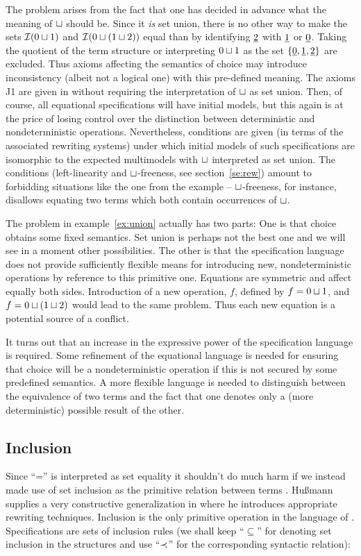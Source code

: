 {The problem arises from the fact that one has decided in advance what
the meaning of $\sqcup$ should be. Since it {\em is} set union, there is
no other way to make the sets ${\cal I}(0\sqcup 1)$ and ${\cal I}(0\sqcup (1\sqcup 2))$
equal than by identifying $\underline{2}$ with $\underline{1}$ or $\underline{0}$. Taking
the quotient of the term structure or interpreting $0\sqcup 1$ as the set
$\{\underline{0},\underline{1},\underline{2}\}$ are excluded.  Thus axioms affecting the
semantics of choice may introduce inconsistency (albeit not a logical
one) with this pre-defined meaning.  The axioms J1 are given in
\cite{c:63} without requiring the interpretation of $\sqcup$ as set
union. Then, of course, all equational specifications will have
initial models, but this again is at the price of losing control over
the distinction between deterministic and nondeterministic operations.
Nevertheless, conditions are given (in terms of the associated
rewriting systems) under which initial models of such specifications
are isomorphic to the expected multimodels with $\sqcup$ interpreted as
set union. The conditions (left-linearity and $\sqcup$-freeness, see
section~\ref{se:rew}) amount to forbidding situations like the one
from the example -- $\sqcup$-freeness, for instance, disallows equating
two terms which both contain occurrences of $\sqcup$.

The problem in example~\ref{ex:union} actually has two parts: One is that choice obtains some fixed 
semantics. Set union is perhaps not the best one and we will see in a moment other  possibilities. The 
other is that the specification language does not provide sufficiently flexible means for introducing new, 
nondeterministic operations by reference to this primitive one. Equations are symmetric and affect equally 
both sides. Introduction of a new operation, $f$, defined by $f=0\sqcup 1$, 
and $f=0\sqcup (1\sqcup 2)$ would lead to the same 
problem. Thus each new equation is a potential source of a conflict. 

It turns out that an increase in the expressive power of the specification language is required. Some 
refinement of the equational language is needed for ensuring that choice will be a nondeterministic 
operation if this is not secured by some predefined semantics. A more flexible language is needed to 
distinguish between the equivalence of two terms and the fact that one denotes only a (more 
deterministic) possible result of the other.

\subsection{Inclusion}\label{sub:inclusion}
Since ``='' is interpreted as set equality it shouldn't do much harm
if we instead made use of set inclusion as the primitive relation
between terms \cite{c:59, c:58, c:127, c:133, c:130}.  Hu{\ss}mann
supplies a very constructive generalization in \cite{c:59, c:58} where
he introduces appropriate rewriting techniques. Inclusion is the only
primitive operation in the language of \cite{c:59,
c:58}. Specifications are sets of inclusion rules (we shall keep
``$\subseteq$'' for denoting set inclusion in the structures and use
``$\mathrel{\prec}$'' for the corresponding syntactic relation):

}

